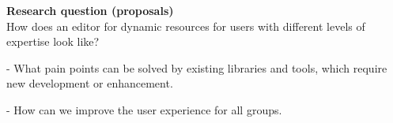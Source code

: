 \textbf{Research question (proposals)}\vspace{2mm}\\

How does an editor for dynamic resources for users with different levels of expertise look like?

- What pain points can be solved by existing libraries and tools, which require new development or enhancement.

- How can we improve the user experience for all groups.
